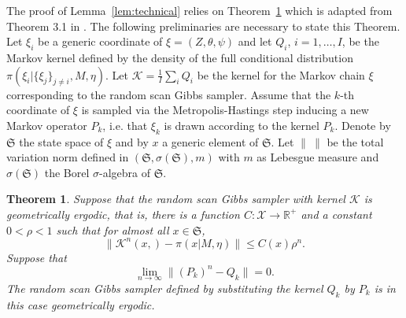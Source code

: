 \documentclass[11pt]{amsart}
\newtheorem{theorem}{Theorem}
\theoremstyle{definition}
\begin{document}
The proof of Lemma~\ref{lem:technical} relies on Theorem~\ref{th:RR}
which is adapted from Theorem 3.1 in \cite{RR07}. The following
preliminaries are necessary to state this Theorem. Let $\xi_i$ be a
generic coordinate of $\xi = (Z, \theta, \psi)$ and let $Q_i$, $i = 1,
\ldots, I$, be the Markov kernel defined by the density of the full
conditional distribution $\pi(\xi_i|\{\xi_j\}_{j\neq i}, M,
\eta)$. Let $\mathcal K = \frac{1}{I}\sum_i Q_i$ be the kernel for the
Markov chain $\xi$ corresponding to the random scan Gibbs
sampler. Assume that the $k$-th coordinate of $\xi$ is sampled via the
Metropolis-Hastings step inducing a new Markov operator $P_k$,
i.e. that $\xi_k$ is drawn according to the kernel $P_k$. Denote by
$\mathfrak S$ the state space of $\xi$ and by $x$ a generic
element of $\mathfrak S$. Let $\|\ \|$ be the total variation norm
defined in $(\mathfrak S, \sigma(\mathfrak S), m)$ with $m$ as
Lebesgue measure and $\sigma(\mathfrak S)$ the Borel $\sigma$-algebra
of $\mathfrak S$.

\begin{theorem}\label{th:RR} Suppose that the random scan Gibbs
  sampler with kernel $\mathcal K$ is geometrically ergodic, that is,
  there is a function $C:\mathcal X \to \mathbb R^+$ and a constant $0
  < \rho < 1$ such that for almost all $x \in \mathfrak S$,
 \begin{equation}
  \label{eqn:Gibbsergodic}
  \|\mathcal K^n(x, ) - \pi(x|M, \eta)\| \leq C(x)\rho^n.
  \tag{$*$}
 \end{equation}
 Suppose that
 \begin{equation}
  \label{eqn:MHtofullcond}
   \lim_{n\to\infty} \|(P_k)^n -  Q_k \| = 0. \tag{$**$}
 \end{equation}
The random scan Gibbs sampler defined by substituting the kernel
$Q_k$ by $P_k$ is in this case geometrically ergodic.
\end{theorem}
\end{document}
